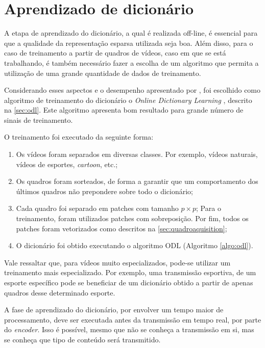 \documentclass[cic,tc]{iiufrgs}
\begin{document}
\section{Aprendizado de dicionário}
\label{sec:learn}
A etapa de aprendizado do dicionário, a qual é realizada off-line, é essencial para que a qualidade da representação
esparsa utilizada seja boa.
Além disso, para o caso de treinamento a partir de quadros de vídeos, caso em que se está
trabalhando, é também necessário fazer a escolha de um algoritmo que permita a utilização
de uma grande quantidade de dados de treinamento.

Considerando esses aspectos e o desempenho apresentado por \citet{MairalOnlineDictLearn}, foi escolhido
como algoritmo de treinamento do dicionário o \textit{Online Dictionary Learning} \cite{MairalOnlineDictLearn},
descrito na \autoref{sec:odl}.
Este algoritmo apresenta bom resultado para grande número de sinais de treinamento.

O treinamento foi executado da seguinte forma:
\begin{enumerate}
    \item Os vídeos foram separados em diversas classes. Por exemplo, vídeos naturais, vídeos
    de esportes, \textit{cartoon}, etc.;
    \item Os quadros foram sorteados, de forma a garantir que um comportamento dos últimos quadros
    não prepondere sobre todo o dicionário;
    \item Cada quadro foi separado em patches com tamanho $p \times p$;
    Para o treinamento, foram utilizados patches com sobreposição. Por fim, todos os patches
    foram vetorizados como descritos na \autoref{sec:quadroaquisition};
    \item O dicionário foi obtido executando o algoritmo ODL (Algoritmo \ref{algo:odl}).
\end{enumerate}

Vale ressaltar que, para vídeos muito especializados, pode-se utilizar um treinamento
mais especializado. 
Por exemplo, uma transmissão esportiva, de um esporte específico pode se beneficiar 
de um dicionário obtido a partir de apenas quadros desse determinado esporte.

A fase de aprendizado do dicionário, por envolver um tempo maior de processamento,
deve ser executada antes da transmissão em tempo real, por parte do \textit{encoder}.
Isso é possível, mesmo que não
se conheça a transmissão em si, mas se conheça que tipo de conteúdo será transmitido.
\end{document}
